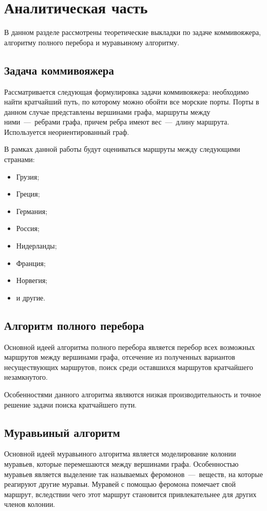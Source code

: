 \chapter{Аналитическая часть}

В данном разделе рассмотрены теоретические выкладки по задаче коммивояжера, алгоритму полного перебора и муравьиному алгоритму.

\section{Задача коммивояжера}
Рассматривается следующая формулировка задачи коммивояжера: необходимо найти кратчайший путь, по которому можно обойти все морские порты. Порты в данном случае представлены вершинами графа, маршруты между ними~---~ребрами графа, причем ребра имеют вес~---~длину маршрута. Используется неориентированный граф.

В рамках данной работы будут оцениваться маршруты между следующими странами:

\begin{itemize}
	\item Грузия;
	\item Греция;
	\item Германия;
	\item Россия;
	\item Нидерланды;
	\item Франция;
	\item Норвегия;
	\item и другие.
\end{itemize}



\section{Алгоритм полного перебора}
Основной идеей алгоритма полного перебора является перебор всех возможных маршрутов между вершинами графа, отсечение из полученных вариантов несуществующих маршрутов, поиск среди оставшихся маршрутов кратчайшего незамкнутого.

Особенностями данного алгоритма являются низкая производительность и точное решение задачи поиска кратчайшего пути.

\section{Муравьиный алгоритм}

Основной идеей муравьиного алгоритма является моделирование колонии муравьев, которые перемешаются между вершинами графа. Особенностью муравьев является выделение так называемых феромонов~---~веществ, на которые реагируют другие муравьи. Муравей с помощью феромона помечает свой маршрут, вследствии чего этот маршрут становится привлекательнее для других членов колонии. 

